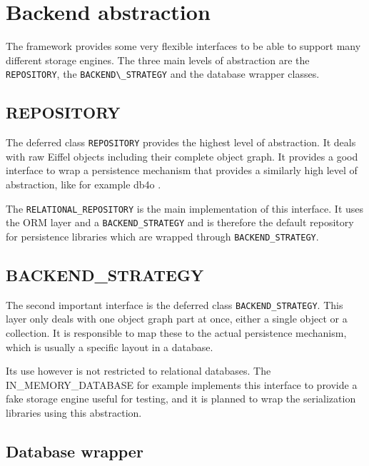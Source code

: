 \section{Backend abstraction}

The framework provides some very flexible interfaces to be able to support many different storage engines. 
The three main levels of abstraction are the \lstinline!REPOSITORY!, the \lstinline!BACKEND\_STRATEGY! and the database wrapper classes.

\subsection{REPOSITORY}

The deferred class \lstinline!REPOSITORY! provides the highest level of abstraction.
It deals with raw Eiffel objects including their complete object graph.
It provides a good interface to wrap a persistence mechanism that provides a similarly high level of abstraction, like for example db4o \cite{db4o}.

The \lstinline!RELATIONAL_REPOSITORY! is the main implementation of this interface.
It uses the ORM layer and a \lstinline!BACKEND_STRATEGY! and is therefore the default repository for persistence libraries which are wrapped through \lstinline!BACKEND_STRATEGY!.

\subsection{BACKEND\_STRATEGY}

The second important interface is the deferred class \lstinline!BACKEND_STRATEGY!.
This layer only deals with one object graph part at once, either a single object or a collection.
It is responsible to map these to the actual persistence mechanism, which is usually a specific layout in a database.

Its use however is not restricted to relational databases.
The IN\_MEMORY\_DATABASE for example implements this interface to provide a fake storage engine useful for testing, and it is planned to wrap the serialization libraries using this abstraction.

\subsection{Database wrapper}


